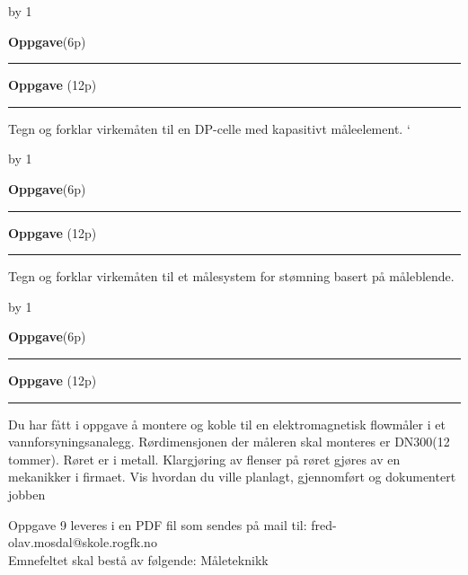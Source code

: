 \documentclass[12pt,a4paper]{article}
\def\oppgave{
            \advance\questnum by 1
	    \ifthenelse{\questnum>0\AND \questnum<9}
	    {
                \vskip 1cm
		\textbf{Oppgave}\hskip 5pt\the\questnum \hfill \hfill(6p)
		\vskip 3pt
		\hrule
	\vskip 0.5cm}
	{
                \vskip 1cm
		\textbf{Oppgave}\hskip 5pt \the\questnum \hfill \hfill(12p)
		\vskip 3pt \hrule \vskip 0.5cm }

		}
\begin{document}
\vskip 0.5cm
\newpage
\oppgave{} 
Tegn og forklar virkemåten til en DP-celle med kapasitivt måleelement. `
\vskip 0.5cm
\newpage
\oppgave{} 
Tegn og forklar virkemåten til et målesystem for stømning basert på måleblende. 
\vskip 0.5cm
\newpage
\oppgave{} 
Du har fått i oppgave å montere og koble til en elektromagnetisk flowmåler i et vannforsyningsanalegg. Rørdimensjonen der måleren skal monteres er DN300(12 tommer). Røret er i metall. Klargjøring av flenser på røret gjøres av en mekanikker i firmaet. 
\vskip 1cm 
Vis hvordan du ville planlagt, gjennomført og dokumentert jobben

\vskip 1cm 

Oppgave 9 leveres i en PDF fil som sendes på mail til:
\vskip 1cm 
fred-olav.mosdal@skole.rogfk.no\\
Emnefeltet skal bestå av følgende:
Måleteknikk
\end{document}
